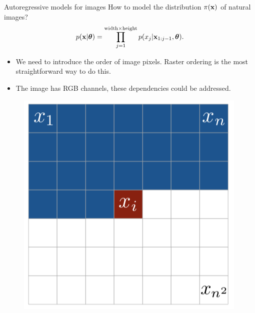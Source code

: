 \begin{frame}{Autoregressive models for images}
	How to model the distribution $\pi(\mathbf{x})$ of natural images?
	\[
  		p(\mathbf{x} | \boldsymbol{\theta}) = \prod_{j=1}^{\text{width} \times \text{height}} p(x_j|\mathbf{x}_{1:j-1}, \boldsymbol{\theta}).
	\]
	\begin{minipage}[t]{0.5\columnwidth}
		\vspace{0.5cm}
		\begin{itemize}
			\item We need to introduce the order of image pixels. Raster ordering is the most straightforward way to do this.
		    \item The image has RGB channels, these dependencies could be addressed.
		\end{itemize}
	\end{minipage}%
	\begin{minipage}[t]{0.5\columnwidth}
		\begin{figure}
			\centering
   			\includegraphics[width=0.9\linewidth]{figs/pixelcnn1.png}
		\end{figure}
	\end{minipage}
\end{frame}
